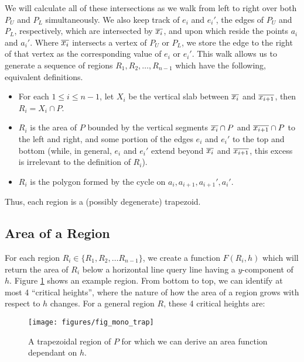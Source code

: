 We will calculate all of these intersections as we walk from left to right over both $P_U$ and $P_L$ simultaneously. 
We also keep track of $e_i$ and $e_i'$, the edges of $P_U$ and $P_L$, respectively, which are intersected by $\overline{x_i}$, and upon which reside the points $a_i$ and $a_i'$. 
Where $\overline{x_i}$ intersects a vertex of $P_U$ or $P_L$, we store the edge to the right of that vertex as the corresponding value of $e_i$ or $e_i'$.
This walk allows us to generate a sequence of regions $R_1, R_2, \dots, R_{n-1}$ which have the following, equivalent definitions.
\begin{itemize}
 \item For each $1 \leq i \leq n - 1$, let $X_i$ be the vertical slab between $\overline{x_i}$ and $\overline{x_{i+1}}$, then $R_i = X_i \cap P$.

 \item $R_i$ is the area of $P$ bounded by the vertical segments $\overline{x_i} \cap P$ and $\overline{x_{i+1}} \cap P$ to the left and right, and some portion of the edges $e_i$ and $e_i'$ to the top and bottom (while, in general, $e_i$ and  $e_i'$ extend beyond $\overline{x_i}$ and $\overline{x_{i+1}}$, this excess is irrelevant to the definition of $R_i$).
 
 \item $R_i$ is the polygon formed by the cycle on $a_i, a_{i+1}, a_{i+1}', a_i'$.
\end{itemize}

\noindent
Thus, each region is a (possibly degenerate) trapezoid.


\subsection{Area of a Region}
\label{sec:region_area}

For each region $R_i \in \{R_1, R_2, \ldots R_{n-1}\}$, we create a function $F(R_i, h)$ which will return the area of $R_i$ below a horizontal line query line having a $y$-component of $h$.
Figure \ref{fig:monotonep:trapezoid} shows an example region.
From bottom to top, we can identify at most 4 ``critical heights'', where the nature of how the area of a region grows with respect to $h$ changes.
For a general region $R$, these 4 critical heights are:

\begin{figure}[t]
\begin{center}
  \texttt{[image: figures/fig\_mono\_trap]}
  \caption[A trapezoidal region of $P$.]{A trapezoidal region of $P$ for which we can derive an area function dependant on $h$.}
  \label{fig:monotonep:trapezoid}
\end{center}
\end{figure}

